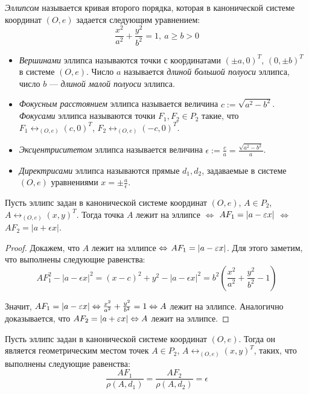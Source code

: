 \begin{definition}
	\textit{Эллипсом} называется кривая второго порядка, которая в канонической системе координат $(O, e)$ задается следующим уравнением:
	\[\frac{x^2}{a^2} + \frac{y^2}{b^2} = 1,~a \ge b > 0\]
	
	\begin{itemize}
		\item \textit{Вершинами} эллипса называются точки с координатами $(\pm a, 0)^T$, $(0, \pm b)^T$ в системе $(O, e)$. Число $a$ называется \textit{длиной большой полуоси} эллипса, число $b$ --- \textit{длиной малой полуоси} эллипса.
		
		\item \textit{Фокусным расстоянием} эллипса называется величина $c := \sqrt{a^2 - b^2}$. \textit{Фокусами} эллипса называются точки $F_1, F_2 \in P_2$ такие, что $F_1 \leftrightarrow_{(O, e)} (c, 0)^T$, $F_2 \leftrightarrow_{(O, e)} (-c, 0)^T$.
		
		\item \textit{Эксцентриситетом} эллипса называется величина $\epsilon := \frac{c}{a} = \frac{\sqrt{a^2 - b^2}}{a}$.
		
		\item \textit{Директрисами} эллипса называются прямые $d_1, d_2$, задаваемые в системе $(O, e)$ уравнениями $x = \pm \frac{a}{\epsilon}$.
	\end{itemize}
\end{definition}

\begin{theorem}
	Пусть эллипс задан в канонической системе координат $(O, e)$, $A \in P_2$, $A \leftrightarrow_{(O, e)} (x, y)^T$. Тогда точка $A$ лежит на эллипсе $\Leftrightarrow$ $AF_1 \hm{=} |a - \epsilon  x|$ $\Leftrightarrow$ $AF_2 = |a + \epsilon x|$.
\end{theorem}

\begin{proof}
	Докажем, что $A$ лежит на эллипсе $\Leftrightarrow$ $AF_1 \hm{=} |a - \epsilon  x|$. Для этого заметим, что выполнены следующие равенства:
	\[AF_1^2 - |a - \epsilon x|^2 = (x - c)^2 + y^2 - |a - \epsilon x|^2 = b^2\left(\frac{x^2}{a^2}+\frac{y^2}{b^2} - 1\right)\]
	
	Значит, $AF_1 = |a - \varepsilon x| \Leftrightarrow \frac{x^2}{a^2}+\frac{y^2}{b^2} = 1 \Leftrightarrow A$ лежит на эллипсе. Аналогично доказывается, что $AF_2 \hm{=} |a + \epsilon  x| \lra A$ лежит на эллипсе.
\end{proof}

\begin{theorem}
	Пусть эллипс задан в канонической системе координат $(O, e)$. Тогда он является геометрическим местом точек $A \in P_2$, $A \leftrightarrow_{(O, e)} (x, y)^T$, таких, что выполнены следующие равенства:
	\[\frac{AF_1}{\rho(A, d_1)} = \frac{AF_2}{\rho(A, d_2)} = \epsilon\]
\end{theorem}

